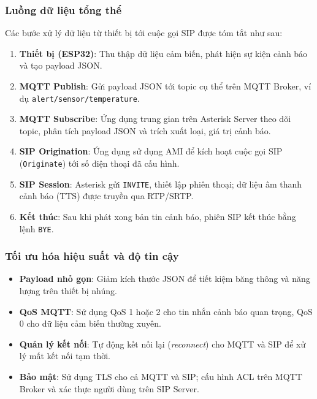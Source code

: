 \subsubsection{Luồng dữ liệu tổng thể}
Các bước xử lý dữ liệu từ thiết bị tới cuộc gọi SIP được tóm tắt như sau:
\begin{enumerate}
    \item \textbf{Thiết bị (ESP32)}: Thu thập dữ liệu cảm biến, phát hiện sự kiện cảnh báo và tạo payload JSON.
    \item \textbf{MQTT Publish}: Gửi payload JSON tới topic cụ thể trên MQTT Broker, ví dụ \texttt{alert/sensor/temperature}.
    \item \textbf{MQTT Subscribe}: Ứng dụng trung gian trên Asterisk Server theo dõi topic, phân tích payload JSON và trích xuất loại, giá trị cảnh báo.
    \item \textbf{SIP Origination}: Ứng dụng sử dụng AMI để kích hoạt cuộc gọi SIP (\texttt{Originate}) tới số điện thoại đã cấu hình.
    \item \textbf{SIP Session}: Asterisk gửi \texttt{INVITE}, thiết lập phiên thoại; dữ liệu âm thanh cảnh báo (TTS) được truyền qua RTP/SRTP.
    \item \textbf{Kết thúc}: Sau khi phát xong bản tin cảnh báo, phiên SIP kết thúc bằng lệnh \texttt{BYE}.
\end{enumerate}

\subsubsection{Tối ưu hóa hiệu suất và độ tin cậy}
\begin{itemize}
    \item \textbf{Payload nhỏ gọn}: Giảm kích thước JSON để tiết kiệm băng thông và năng lượng trên thiết bị nhúng.
    \item \textbf{QoS MQTT}: Sử dụng QoS 1 hoặc 2 cho tin nhắn cảnh báo quan trọng, QoS 0 cho dữ liệu cảm biến thường xuyên.
    \item \textbf{Quản lý kết nối}: Tự động kết nối lại (\textit{reconnect}) cho MQTT và SIP để xử lý mất kết nối tạm thời.
    \item \textbf{Bảo mật}: Sử dụng TLS cho cả MQTT và SIP; cấu hình ACL trên MQTT Broker và xác thực người dùng trên SIP Server.
\end{itemize}
